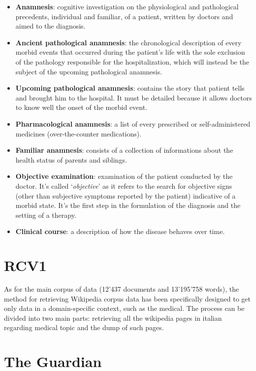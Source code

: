 \begin{itemize}
	\item \textbf{Anamnesis}: cognitive investigation on the physiological and pathological precedents, individual and familiar, of a patient, written by doctors and aimed to the diagnosis. 
	\item \textbf{Ancient pathological anamnesis}: the chronological description of every morbid events that occurred during the patient's life with the sole exclusion of the pathology responsible for the hospitalization, which will instead be the subject of the upcoming pathological anamnesis. 
	\item \textbf{Upcoming pathological anamnesis}: contains the story that patient tells and brought him to the hospital. It must be detailed because it allows doctors to know well the onset of the morbid event.
	\item \textbf{Pharmacological anamnesis}: a list of every prescribed or self-administered medicines (over-the-counter medications).
	\item \textbf{Familiar anamnesis}: consists of a collection of informations about the health status of parents and siblings.
	\item \textbf{Objective examination}: examination of the patient conducted by the doctor. It's called \enquote*{\textit{objective}} as it refers to the search for objective signs (other than subjective symptoms reported by the patient) indicative of a morbid state. It's the first step in the formulation of the diagnosis and the setting of a therapy.
	\item \textbf{Clinical course}: a description of how the disease behaves over time.
\end{itemize}

\section{RCV1}

As for the main corpus of data (12'437 documents and 13'195'758 words), the method for retrieving Wikipedia corpus data has been specifically designed to get only data in a domain-specific context, such as the medical.
The process can be divided into two main parts: retrieving all the wikipedia pages in italian regarding medical topic and the dump of such pages.

\section{The Guardian}

